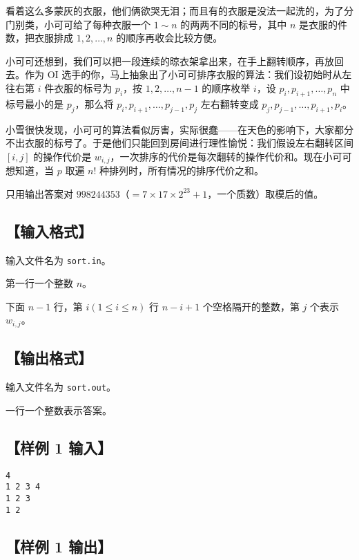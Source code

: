 \documentclass[11pt,a4paper,oneside]{article}
\begin{document}
看着这么多蒙灰的衣服，他们俩欲哭无泪；而且有的衣服是没法一起洗的，为了分门别类，小可可给了每种衣服一个 $1 \sim n$ 的两两不同的标号，其中 $n$ 是衣服的件数，把衣服排成 $1,2,\ldots,n$ 的顺序再收会比较方便。

小可可还想到，我们可以把一段连续的晾衣架拿出来，在手上翻转顺序，再放回去。作为 OI 选手的你，马上抽象出了小可可排序衣服的算法：我们设初始时从左往右第 $i$ 件衣服的标号为 $p_i$，按 $1,2,\ldots,n-1$ 的顺序枚举 $i$，设 $p_i,p_{i+1},\ldots,p_n$ 中标号最小的是 $p_j$，那么将 $p_i,p_{i+1},\ldots,p_{j-1},p_j$ 左右翻转变成 $p_j,p_{j-1},\ldots,p_{i+1},p_i$。

小雪很快发现，小可可的算法看似厉害，实际很蠢——在天色的影响下，大家都分不出衣服的标号了。于是他们只能回到房间进行理性愉悦：我们假设左右翻转区间 $[i,j]$ 的操作代价是 $w_{i,j}$，一次排序的代价是每次翻转的操作代价和。现在小可可想知道，当 $p$ 取遍 $n!$ 种排列时，所有情况的排序代价之和。

只用输出答案对 $998244353$（$=7 \times 17 \times 2^{23} + 1$，一个质数）取模后的值。

\subsection*{【输入格式】}

输入文件名为 \texttt{sort.in}。

第一行一个整数 $n$。

下面 $n-1$ 行，第 $i(1 \le i \le n)$ 行 $n - i + 1$ 个空格隔开的整数，第 $j$ 个表示 $w_{i,j}$。

\subsection*{【输出格式】}

输入文件名为 \texttt{sort.out}。

一行一个整数表示答案。

\subsection*{【样例 1 输入】}

\begin{verbatim}
4
1 2 3 4
1 2 3
1 2
\end{verbatim}

\subsection*{【样例 1 输出】}
\end{document}
